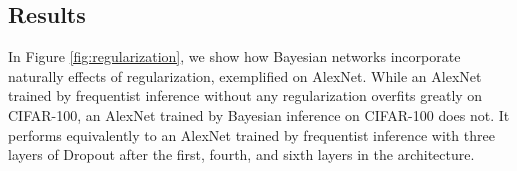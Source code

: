 \subsection{Results}

\begin{table}[H]
\tiny
    \centering
    \renewcommand{\arraystretch}{1.5}
    \renewcommand{\arraystretch}{1.5}
    \caption{Comparison of validation accuracies (in percentage) for different architectures with variational inference (VI), frequentist inference and Dropout as a Bayesian approximation as proposed by Gal and Ghahramani \cite{gal2015bayesian} for MNIST, CIFAR-10, and CIFAR-100.}
    \label{tab:resultsCIFAR-100}
\end{table}



In Figure \ref{fig:regularization}, we show how Bayesian networks incorporate naturally effects of regularization, exemplified on AlexNet. While an AlexNet trained by frequentist inference without any regularization overfits greatly on CIFAR-100, an AlexNet trained by Bayesian inference on CIFAR-100 does not. It performs equivalently to an AlexNet trained by frequentist inference with three layers of Dropout after the first, fourth, and sixth layers in the architecture.

